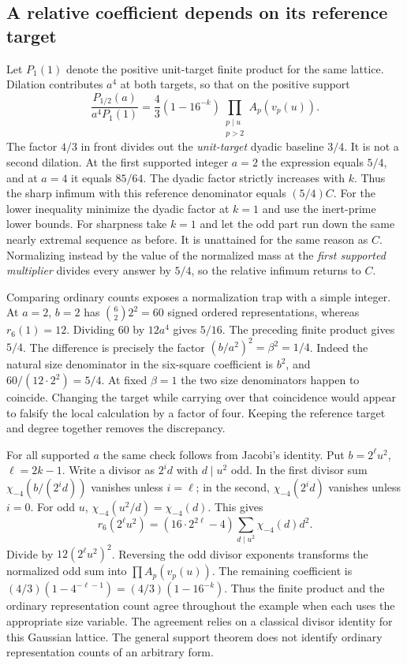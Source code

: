 \documentclass[12pt,letterpaper]{article}
\begin{document}
\subsection{A relative coefficient depends on its reference target}
Let $P_1(1)$ denote the positive unit-target finite product for the same lattice. Dilation contributes $a^4$ at both targets, so that on the positive support
\[
  \frac{P_{1/2}(a)}{a^4P_1(1)}
     =\frac{4}{3}(1-16^{-k})
                       \prod_{\substack{p\mid u\\p>2}}A_p(v_p(u)).
\]
The factor $4/3$ in front divides out the \emph{unit-target} dyadic baseline $3/4$. It is not a second dilation. At the first supported integer $a=2$ the expression equals $5/4$, and at $a=4$ it equals $85/64$. The dyadic factor strictly increases with $k$. Thus the sharp infimum with this reference denominator equals $(5/4)C$. For the lower inequality minimize the dyadic factor at $k=1$ and use the inert-prime lower bounds. For sharpness take $k=1$ and let the odd part run down the same nearly extremal sequence as before. It is unattained for the same reason as $C$. Normalizing instead by the value of the normalized mass at the \emph{first supported multiplier} divides every answer by $5/4$, so the relative infimum returns to $C$.

Comparing ordinary counts exposes a normalization trap with a simple integer. At $a=2$, $b=2$ has $\binom{6}{2}2^2=60$ signed ordered representations, whereas $r_6(1)=12$. Dividing $60$ by $12a^4$ gives $5/16$. The preceding finite product gives $5/4$. The difference is precisely the factor $(b/a^2)^2=\beta^2=1/4$. Indeed the natural size denominator in the six-square coefficient is $b^2$, and $60/(12\cdot2^2)=5/4$. At fixed $\beta=1$ the two size denominators happen to coincide. Changing the target while carrying over that coincidence would appear to falsify the local calculation by a factor of four. Keeping the reference target and degree together removes the discrepancy.

For all supported $a$ the same check follows from Jacobi's identity. Put $b=2^\ell u^2$, $\ell=2k-1$. Write a divisor as $2^i d$ with $d\mid u^2$ odd. In the first divisor sum $\chi_{-4}(b/(2^i d))$ vanishes unless $i=\ell$; in the second, $\chi_{-4}(2^i d)$ vanishes unless $i=0$. For odd $u$, $\chi_{-4}(u^2/d)=\chi_{-4}(d)$. This gives
\[
 r_6(2^\ell u^2)
 = (16\cdot 2^{2\ell}-4)\sum_{d\mid u^2}\chi_{-4}(d)d^2 .
\]
Divide by $12(2^\ell u^2)^2$. Reversing the odd divisor exponents transforms the normalized odd sum into $\prod A_p(v_p(u))$. The remaining coefficient is $(4/3)(1-4^{-\ell-1})=(4/3)(1-16^{-k})$. Thus the finite product and the ordinary representation count agree throughout the example when each uses the appropriate size variable. The agreement relies on a classical divisor identity for this Gaussian lattice. The general support theorem does not identify ordinary representation counts of an arbitrary form.
\end{document}

